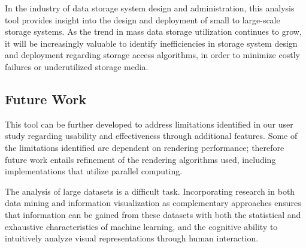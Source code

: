 \documentclass[journal]{vgtc}                %
\begin{document}
In the industry of data storage system design and administration, this analysis tool provides insight into the design and deployment of small to large-scale storage systems. As the trend in mass data storage utilization continues to grow, it will be increasingly valuable to identify inefficiencies in storage system design and deployment regarding storage access algorithms, in order to minimize costly failures or underutilized storage media.

\subsection{Future Work}
\label{future_work}
This tool can be further developed to address limitations identified in our user study regarding usability and effectiveness through additional features. Some of the limitations identified are dependent on rendering performance; therefore future work entails refinement of the rendering algorithms used, including implementations that utilize parallel computing.

The analysis of large datasets is a difficult task. Incorporating research in both data mining and information visualization as complementary approaches ensures that information can be gained from these datasets with both the statistical and exhaustive characteristics of machine learning, and the cognitive ability to intuitively analyze visual representations through human interaction.





\end{document}
